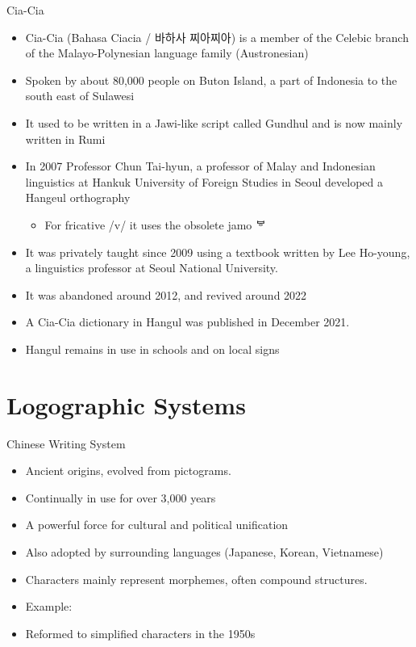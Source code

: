 \documentclass[xetex]{beamer}
\newcommand{\zh}{\mtciteform}
\begin{document}
\begin{frame}{Cia-Cia}
  \begin{itemize}
  \item  Cia-Cia (Bahasa Ciacia / \textkorean{바하사 찌아찌아})  is a member of the Celebic branch of the Malayo-Polynesian language family (Austronesian)
  \item Spoken by about 80,000 people on Buton Island, a part of Indonesia to the south east of Sulawesi
  \item It used to be written in a Jawi-like script called Gundhul and is now mainly written in Rumi
    
  \item In 2007  Professor Chun Tai-hyun, a professor of Malay and Indonesian linguistics at Hankuk University of Foreign Studies in Seoul developed a Hangeul orthography
    \begin{itemize}
    \item For fricative /v/ it uses the obsolete jamo  \textkorean{ᄫ} 
    \end{itemize}
  \item It was privately taught since 2009 using a textbook written by Lee Ho-young, a linguistics professor at Seoul National University.
  \item It was abandoned around 2012, and revived around 2022 
  \item A Cia-Cia dictionary in Hangul was published in December 2021.
  \item Hangul remains in use in schools and on local signs
\end{itemize}

\end{frame}


\section{Logographic Systems}

\begin{frame}{Chinese Writing System}
\begin{itemize}
    \item Ancient origins, evolved from pictograms.
    \item Continually in use for over 3,000 years
    \item A powerful force for cultural and political uniﬁcation
    \item Also adopted by surrounding languages (Japanese, Korean, Vietnamese)
    \item Characters mainly represent morphemes, often compound structures.
    \item Example:
    \begin{exe}
    \ex 
     \zh[hello `you good' ]{nǐ hǎo} 
    \ex 
     \zh[mountain]{shān}
    \end{exe}
  \item Reformed to simplified characters in the 1950s
\end{itemize}
\end{frame}
\end{document}

